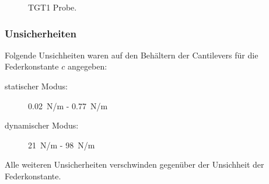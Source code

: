 \documentclass[
	a4paper,
	12pt,
	pagesize,
	ngerman
]{scrartcl}
\begin{document}
\begin{figure}[H]
			\caption{TGT1 Probe.}
\end{figure}

	\subsubsection{Unsicherheiten} %
	Folgende Unsichheiten waren auf den Behältern der Cantilevers für die Federkonstante $c$ angegeben:
	\begin{description}
		\item[statischer Modus:] \SI{0.02}{N/m} - \SI{0.77}{N/m} %
		\item[dynamischer Modus:] \SI{21}{N/m} - \SI{98}{N/m}
	\end{description}
	Alle weiteren Unsicherheiten verschwinden gegenüber der Unsichheit der Federkonstante. %
\end{document}
